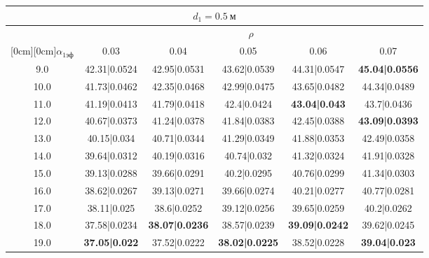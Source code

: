 \documentclass[20pt]{article}
\begin{document}
\begin{center}
\begin{tabular}{c|ccccc}
\hline
	\multicolumn{6}{c}{$d_{1}=0.5 \ м$} \\
\hline
	 & \multicolumn{5}{|c}{$\rho$} \\
	\cline{2-6}
	\raisebox{1.5ex}[0cm][0cm]{$\alpha_{1эф}$} & 0.03 & 0.04 & 0.05 & 0.06 & 0.07\\
\hline
	9.0 & 	42.31|0.0524 & 	42.95|0.0531 & 	43.62|0.0539 & 	44.31|0.0547 & 	\textbf{45.04|0.0556}\\
	10.0 & 	41.73|0.0462 & 	42.35|0.0468 & 	42.99|0.0475 & 	43.65|0.0482 & 	44.34|0.0489\\
	11.0 & 	41.19|0.0413 & 	41.79|0.0418 & 	42.4|0.0424 & 	\textbf{43.04|0.043} & 	43.7|0.0436\\
	12.0 & 	40.67|0.0373 & 	41.24|0.0378 & 	41.84|0.0383 & 	42.45|0.0388 & 	\textbf{43.09|0.0393}\\
	13.0 & 	40.15|0.034 & 	40.71|0.0344 & 	41.29|0.0349 & 	41.88|0.0353 & 	42.49|0.0358\\
	14.0 & 	39.64|0.0312 & 	40.19|0.0316 & 	40.74|0.032 & 	41.32|0.0324 & 	41.91|0.0328\\
	15.0 & 	39.13|0.0288 & 	39.66|0.0291 & 	40.2|0.0295 & 	40.76|0.0299 & 	41.34|0.0303\\
	16.0 & 	38.62|0.0267 & 	39.13|0.0271 & 	39.66|0.0274 & 	40.21|0.0277 & 	40.77|0.0281\\
	17.0 & 	38.11|0.025 & 	38.6|0.0252 & 	39.12|0.0256 & 	39.65|0.0259 & 	40.2|0.0262\\
	18.0 & 	37.58|0.0234 & 	\textbf{38.07|0.0236} & 	38.57|0.0239 & 	\textbf{39.09|0.0242} & 	39.62|0.0245\\
	19.0 & 	\textbf{37.05|0.022} & 	37.52|0.0222 & 	\textbf{38.02|0.0225} & 	38.52|0.0228 & 	\textbf{39.04|0.023}\\
\end{tabular}


\end{center}
\end{document}
